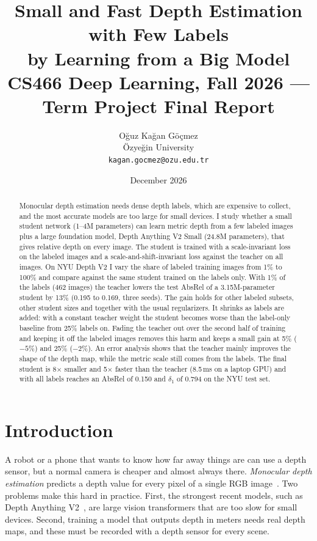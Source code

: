 \documentclass[11pt]{article}
\title{\textbf{Small and Fast Depth Estimation with Few Labels\\by Learning from a Big Model}\\[4pt]
\large CS466 Deep Learning, Fall 2026 --- Term Project Final Report}
\author{Oğuz Kağan Göçmez\\
\small Özyeğin University\\
\small \texttt{kagan.gocmez@ozu.edu.tr}}
\date{December 2026}
\begin{document}
\maketitle

\begin{abstract}
\noindent
Monocular depth estimation needs dense depth labels, which are expensive to collect, and the most
accurate models are too large for small devices. I study whether a small student network
(1--4M parameters) can learn metric depth from a few labeled images plus a large foundation
model, Depth Anything V2 Small (24.8M parameters), that gives relative depth on every image.
The student is trained with a scale-invariant loss on the labeled images and a
scale-and-shift-invariant loss against the teacher on all images. On NYU Depth V2 I vary the
share of labeled training images from 1\% to 100\% and compare against the same student trained
on the labels only. With 1\% of the labels (462 images) the teacher lowers the test AbsRel of a
3.15M-parameter student by 13\% (0.195 to 0.169, three seeds). The gain holds for other labeled
subsets, other student sizes and together with the usual regularizers. It shrinks as labels are
added: with a constant teacher weight the student becomes worse than the label-only baseline from
25\% labels on. Fading the teacher out over the second half of training and keeping it off the
labeled images removes this harm and keeps a small gain at 5\% ($-5$\%) and 25\% ($-2$\%). An error
analysis shows that the teacher mainly improves the shape of the depth map, while the metric
scale still comes from the labels. The final student is 8$\times$ smaller and 5$\times$ faster
than the teacher (8.5\,ms on a laptop GPU) and with all labels reaches an AbsRel of 0.150 and
$\delta_1$ of 0.794 on the NYU test set.
\end{abstract}

\section{Introduction}

A robot or a phone that wants to know how far away things are can use a depth sensor, but a
normal camera is cheaper and almost always there. \emph{Monocular depth estimation} predicts a
depth value for every pixel of a single RGB image~\cite{eigen2014}. Two problems make this hard in
practice. First, the strongest recent models, such as Depth Anything V2~\cite{yang2024dav2}, are
large vision transformers that are too slow for small devices. Second, training a model that
outputs depth in meters needs real depth maps, and these must be recorded with a depth sensor for
every scene.
\end{document}
